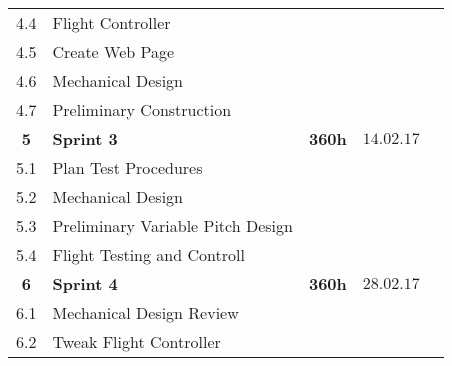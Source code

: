 \begin{center}
\begin{tabular}{cllll}
4.4     & Flight Controller & & \\
4.5     & Create Web Page & &  
\\\rowcolor{gainsboro}
4.6     & Mechanical Design & & \\
4.7     & Preliminary Construction & & 
\\\rowcolor{gainsboro}
\textbf{5} & \textbf{Sprint 3}     & \textbf{360h}     & $14.02.17$ \\
5.1     & Plan Test Procedures &  &  \\\rowcolor{gainsboro}
5.2     & Mechanical Design &  &  \\
5.3     & Preliminary Variable Pitch Design & & \\ \rowcolor{gainsboro}
5.4     & Flight Testing and Controll &  & \\
\textbf{6} & \textbf{Sprint 4}     & \textbf{360h}     & $28.02.17$ \\
\rowcolor{gainsboro}
6.1     & Mechanical Design Review & & \\
6.2     & Tweak Flight Controller & & \\
\end{tabular}                                                                   
\end{center}
\vfill

